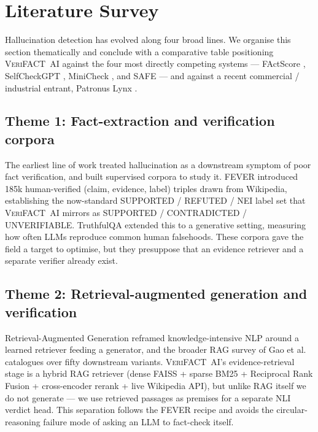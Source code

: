 \documentclass[12pt, a4paper, oneside]{report}
\newcommand{\verifact}{\textsc{VeriFACT~AI}}
\begin{document}
\section{Literature Survey}

Hallucination detection has evolved along four broad lines. We organise this section thematically and conclude with a comparative table positioning \verifact{} against the four most directly competing systems --- FActScore \cite{min2023factscore}, SelfCheckGPT \cite{manakul2023selfcheck}, MiniCheck \cite{tang2024minicheck}, and SAFE \cite{wei2024safe} --- and against a recent commercial / industrial entrant, Patronus Lynx \cite{patronus2024lynx}.

\subsection{Theme 1: Fact-extraction and verification corpora}

The earliest line of work treated hallucination as a downstream symptom of poor fact verification, and built supervised corpora to study it. FEVER \cite{thorne2018fever} introduced 185k human-verified (claim, evidence, label) triples drawn from Wikipedia, establishing the now-standard SUPPORTED / REFUTED / NEI label set that \verifact{} mirrors as SUPPORTED / CONTRADICTED / UNVERIFIABLE. TruthfulQA \cite{lin2022truthfulqa} extended this to a generative setting, measuring how often LLMs reproduce common human falsehoods. These corpora gave the field a target to optimise, but they presuppose that an evidence retriever and a separate verifier already exist.

\subsection{Theme 2: Retrieval-augmented generation and verification}

Retrieval-Augmented Generation \cite{lewis2020rag} reframed knowledge-intensive NLP around a learned retriever feeding a generator, and the broader RAG survey of Gao et al.\ \cite{gao2024rag} catalogues over fifty downstream variants. \verifact{}'s evidence-retrieval stage is a hybrid RAG retriever (dense FAISS + sparse BM25 + Reciprocal Rank Fusion + cross-encoder rerank + live Wikipedia API), but unlike RAG itself we do not generate --- we use retrieved passages as premises for a separate NLI verdict head. This separation follows the FEVER recipe and avoids the circular-reasoning failure mode of asking an LLM to fact-check itself.
\end{document}
